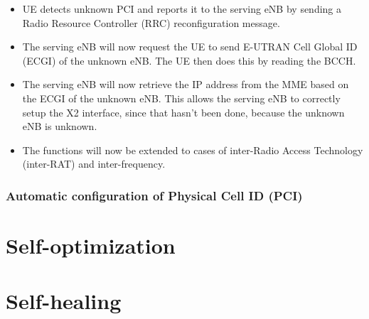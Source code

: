 \documentclass{report}
\begin{document}
\begin{itemize}
	\item UE detects unknown PCI and reports it to the serving eNB by sending a Radio Resource Controller (RRC) reconfiguration message.
	\item The serving eNB will now request the UE to send E-UTRAN Cell Global ID (ECGI) of the unknown eNB. The UE then does this by reading the BCCH. 
	\item The serving eNB will now retrieve the IP address from the MME based on the ECGI of the unknown eNB. This allows the serving eNB to correctly setup the X2 interface, since that hasn't been done, because the unknown eNB is unknown. 
	\item The functions will now be extended to cases of inter-Radio Access Technology (inter-RAT) and inter-frequency. 
\end{itemize}

\subsection{Automatic configuration of Physical Cell ID (PCI)}




\chapter{Self-optimization}


\chapter{Self-healing}


\clearpage
{}


\nocite{Hamalainen2009} %
\nocite{Jamalipour2008} %
\nocite{Kakadia2017} %
\nocite{Sartori2012} %
\end{document}
